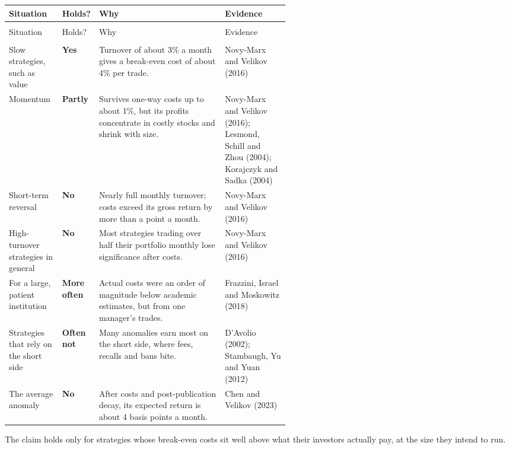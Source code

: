 {\small
\begin{longtable}{@{}>{\raggedright\arraybackslash}p{0.19\linewidth}>{\raggedright\arraybackslash}p{0.13\linewidth}>{\raggedright\arraybackslash}p{}>{\raggedright\arraybackslash}p{0.23\linewidth}@{}}
\toprule
Situation & Holds? & Why & Evidence \\
\midrule
\endfirsthead
\multicolumn{4}{@{}l}{\emph{(continued)}} \\
\toprule
Situation & Holds? & Why & Evidence \\
\midrule
\endhead
\midrule
\multicolumn{4}{r@{}}{\emph{(continued on the next page)}} \\
\endfoot
\bottomrule
\endlastfoot
Slow strategies, such as value & \textbf{Yes} & Turnover of about 3\% a month gives a break-even cost of about 4\% per trade. & Novy-Marx and Velikov (2016) \\*
\addlinespace[3pt]
Momentum & \textbf{Partly} & Survives one-way costs up to about 1\%, but its profits concentrate in costly stocks and shrink with size. & Novy-Marx and Velikov (2016); Lesmond, Schill and Zhou (2004); Korajczyk and Sadka (2004) \\
\addlinespace[3pt]
Short-term reversal & \textbf{No} & Nearly full monthly turnover; costs exceed its gross return by more than a point a month. & Novy-Marx and Velikov (2016) \\
\addlinespace[3pt]
High-turnover strategies in general & \textbf{No} & Most strategies trading over half their portfolio monthly lose significance after costs. & Novy-Marx and Velikov (2016) \\
\addlinespace[3pt]
For a large, patient institution & \textbf{More often} & Actual costs were an order of magnitude below academic estimates, but from one manager's trades. & Frazzini, Israel and Moskowitz (2018) \\
\addlinespace[3pt]
Strategies that rely on the short side & \textbf{Often not} & Many anomalies earn most on the short side, where fees, recalls and bans bite. & D'Avolio (2002); Stambaugh, Yu and Yuan (2012) \\*
\addlinespace[3pt]
The average anomaly & \textbf{No} & After costs and post-publication decay, its expected return is about 4 basis points a month. & Chen and Velikov (2023) \\
\end{longtable}
\addtocounter{table}{-1}%
}

The claim holds only for strategies whose break-even costs sit well above what their investors actually pay, at the size they intend to run.

